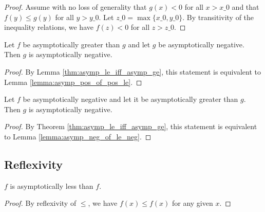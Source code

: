 \begin{proof}
    \leanok
    Assume with no loss of generality that $g(x) < 0$ for all $x > x\_0$ and that
    $f(y) \le g(y)$ for all $y > y\_0$. Let $z\_0 = \max \{ x\_0, y\_0 \}$. By transitivity
    of the inequality relations, we have $f(z) < 0$ for all $z > z\_0$. 
\end{proof}

\begin{lemma}
    \label{lemma:asymp_pos_of_ge_pos}
    \leanok
    Let $f$ be asymptotically greater than $g$ and let $g$ be asymptotically negative.
    Then $g$ is asymptotically negative.
\end{lemma}

\begin{proof}
    \leanok
    By Lemma \ref{thm:asymp_le_iff_asymp_ge}, this statement is equivalent to Lemma
    \ref{lemma:asymp_pos_of_pos_le}.
\end{proof}

\begin{lemma}
    \label{lemma:asymp_neg_of_neg_ge}
    \leanok
    Let $f$ be asymptotically negative and let it be asymptotically greater than $g$.
    Then $g$ is asymptotically negative.
\end{lemma}

\begin{proof}
    \leanok
    By Theorem \ref{thm:asymp_le_iff_asymp_ge}, this statement is equivalent to Lemma
    \ref{lemma:asymp_neg_of_le_neg}.
\end{proof}


\subsection{Reflexivity}

\begin{lemma}
    \label{lemma:asymp_le_refl}
    \leanok
    $f$ is asymptotically less than $f$.
\end{lemma}

\begin{proof}
    \leanok
    By reflexivity of $\le$, we have $f(x) \le f(x)$ for any given $x$.
\end{proof}

